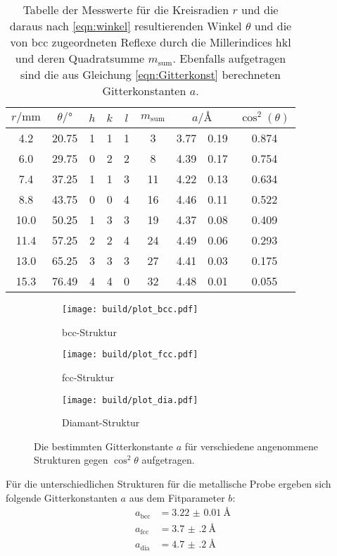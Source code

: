 \begin{table}
\centering
\caption{Tabelle der Messwerte für die Kreisradien $r$ und die daraus nach \ref{eqn:winkel} resultierenden Winkel $\theta$
    und die von bcc zugeordneten Reflexe durch die Millerindices hkl und deren Quadratsumme $m_{\mathrm{sum}}$.
    Ebenfalls aufgetragen sind die
    aus Gleichung \eqref{eqn:Gitterkonst} berechneten Gitterkonstanten $a$.}
  \label{tab:dia}
\begin{tabular}{S S c c c c S[table-format=1.2]@{${}\pm{}$} S[table-format=1.2] S[table-format=1.3]  }
\toprule
$r/\si{\milli\meter}$ & $\theta / \si{\degree}$ &$h$ & $k$ & $l$ & $m_{\mathrm{sum}}$ & 
&  {$\cos^2\left(\theta\right)$} \\
 	&	20.75	&	1	&	1	&	1	&	3	  &	3.77	&	0.19	&	0.874   \\
6.0 	&	29.75	&	0	&	2	&	2	&	8  	&	4.39  &	0.17	&	0.754   \\
7.4 	&	37.25	&	1	&	1	&	3	&	11	&	4.22  &	0.13 	&	0.634   \\
8.8 	&	43.75	&	0	&	0	&	4	&	16  &	4.46  &	0.11	&	0.522   \\
10.0	&	50.25	&	1	&	3	&	3	&	19	&	4.37	&	0.08	&	0.409   \\
11.4	&	57.25	&	2	&	2	&	4	&	24	&	4.49	&	0.06	&	0.293   \\
13.0	&	65.25	&	3	&	3	&	3	&	27	&	4.41	&	0.03	&	0.175   \\
15.3	&	76.49	&	4	&	4	&	0	&	32	&	4.48	&	0.01	&	0.055   \\
\bottomrule
\end{tabular}
\end{table}


\begin{figure}[hhh]
  \centering
  \begin{subfigure}{0.7\textwidth}
    \centering
    \texttt{[image: build/plot\_bcc.pdf]}
    \caption{bcc-Struktur}
    \label{subfig:bcc}
  \end{subfigure}
  \begin{subfigure}{.49\textwidth}
    \centering
    \texttt{[image: build/plot\_fcc.pdf]}
    \caption{fcc-Struktur}
    \label{subfig:fcc}
  \end{subfigure}
  \begin{subfigure}{.49\textwidth}
    \centering
    \texttt{[image: build/plot\_dia.pdf]}
    \caption{Diamant-Struktur}
    \label{subfig:dia}
  \end{subfigure}
  \caption{Die bestimmten Gitterkonstante $a$ für verschiedene angenommene Strukturen gegen $\cos^2\theta$ aufgetragen.}
  \label{fig:metall}
\end{figure}
\FloatBarrier
Für die unterschiedlichen Strukturen für die metallische Probe ergeben sich folgende Gitterkonstanten $a$
aus dem Fitparameter $b$:
\begin{align*}
a_{\mathrm{bcc}}&=\SI{3.22(1)}{\angstrom}\\
a_{\mathrm{fcc}}&=\SI{3.7(2)}{\angstrom}\\
a_{\mathrm{dia}}&=\SI{4.7(2)}{\angstrom}
\end{align*}



